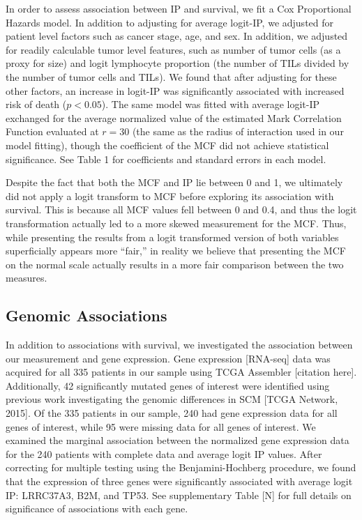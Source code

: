 \documentclass[
]{book}
\begin{document}
In order to assess association between IP and survival, we fit a Cox
Proportional Hazards model. In addition to adjusting for average
logit-IP, we adjusted for patient level factors such as cancer stage,
age, and sex. In addition, we adjusted for readily calculable tumor
level features, such as number of tumor cells (as a proxy for size) and
logit lymphocyte proportion (the number of TILs divided by the number of
tumor cells and TILs). We found that after adjusting for these other
factors, an increase in logit-IP was significantly associated with
increased risk of death (\(p < 0.05\)). The same model was fitted with
average logit-IP exchanged for the average normalized value of the
estimated Mark Correlation Function evaluated at \(r = 30\) (the same as
the radius of interaction used in our model fitting), though the
coefficient of the MCF did not achieve statistical significance. See
Table 1 for coefficients and standard errors in each model.

Despite the fact that both the MCF and IP lie between 0 and 1, we
ultimately did not apply a logit transform to MCF before exploring
its association with survival. This is because all MCF values fell
between 0 and 0.4, and thus the logit transformation actually
led to a more skewed measurement for the MCF. Thus, while presenting
the results from a logit transformed version of both variables
superficially appears more ``fair,'' in reality we believe that
presenting the MCF on the normal scale actually results in a more
fair comparison between the two measures.

\hypertarget{genomic-associations}{%
\subsection{Genomic Associations}\label{genomic-associations}}

In addition to associations with survival, we investigated the
association between our measurement and gene expression. Gene expression
{[}RNA-seq{]} data was acquired for all 335 patients in our sample using
TCGA Assembler {[}citation here{]}. Additionally, 42 significantly mutated
genes of interest were identified using previous work investigating the
genomic differences in SCM {[}TCGA Network, 2015{]}. Of the 335 patients
in our sample, 240 had gene expression data for all genes of interest,
while 95 were missing data for all genes of interest. We examined the
marginal association between the normalized gene expression data for the
240 patients with complete data and average logit IP values. After
correcting for multiple testing using the Benjamini-Hochberg procedure,
we found that the expression of three genes were significantly
associated with average logit IP: LRRC37A3, B2M, and TP53. See
supplementary Table {[}N{]} for full details on significance of
associations with each gene.
\end{document}

